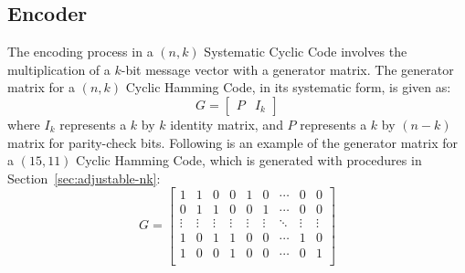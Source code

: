 \documentclass{article}
\begin{document}
\subsection{Encoder}
The encoding process in a $(n,k)$ Systematic Cyclic Code involves the multiplication of a $k$-bit message vector with a generator matrix. The generator matrix for a $(n,k)$ Cyclic Hamming Code, in its systematic form, is given as:
\begin{equation*}
    G = \begin{bmatrix}
        P & I_{k}
    \end{bmatrix}
\end{equation*}
where $I_k$ represents a $k$ by $k$ identity matrix, and $P$ represents a $k$ by $(n-k)$ matrix for parity-check bits. 
Following is an example of the generator matrix for a $(15,11)$ Cyclic Hamming Code, which is generated with procedures in Section~\ref{sec:adjustable-nk}:
\begin{equation*}
    G = 
    \begin{bmatrix}
        1 & 1 & 0 & 0 & 1 & 0 & \cdots & 0 & 0 \\
        0 & 1 & 1 & 0 & 0 & 1 & \cdots & 0 & 0 \\
        \vdots & \vdots & \vdots & \vdots & \vdots & \vdots & \ddots & \vdots & \vdots \\
        1 & 0 & 1 & 1 & 0 & 0 & \cdots & 1 & 0 \\
        1 & 0 & 0 & 1 & 0 & 0 & \cdots & 0 & 1 \\
    \end{bmatrix}
\end{equation*}
\end{document}
